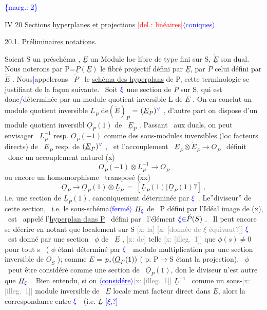 \documentclass[11pt]{article}
\newcommand{\scanpage}[1]{\par\bigskip\noindent{\small\sffamily[scan #1]}\par}
\newcommand{\hand}[1]{\textcolor{blue}{#1}}
\let\over\relax
\newcommand{\over}[2]{\textcolor{gray}{#1}\textcolor{blue}{\ensuremath{^{\!\nearrow}}#2}}
\newcommand{\inserted}[2][]{\textcolor{blue}{$\langle$#2$\rangle$}}
\newcommand{\margin}[1]{\textcolor{blue}{\{\textsf{marg.:} #1\}}}
\newcommand{\deleted}[1]{\textcolor{red}{[\textsf{del.:} #1]}}
\newcommand{\xout}[1]{\textcolor{gray}{[\textsf{x:} #1]}}
\newcommand{\uline}[1]{\underline{#1}}
\newcommand{\unsure}[1]{[#1?]}
\newcommand{\illegible}[1]{[\textsf{illeg.\ #1}]}
\begin{document}
\margin{2}

\clearpage
\scanpage{25/4}
IV 20 \quad \uline{Sections hyperplanes et projections \deleted{linéaires}\inserted{coniques}}.

20.1. \quad \uline{Préliminaires \over{de}{\unsure{et}} notations}.

Soient S un \quad préschéma , $\underline{E}$ un Module loc libre de type fini sur S,
$\check{\underline{E}}$ son dual. Nous noterons par P=$\underline{P}(\underline{E})$ le fibré projectif défini par $\underline{E}$,
par $\check{P}$ celui défini par $\check{\underline{E}}$ . Nous\hand{|}appelerons \ $\check{P}$ \ le \uline{schéma des hyperplans}
de P, cette terminologie se justifiant de la façon suivante. \ Soit
$\hand{\xi}$ une section de $\check{P}$ sur S, qui est donc\hand{/}déterminée par un module quotient
inversible L de $\check{\underline{E}}$ . On en conclut un module quotient inversible
$\underline{L}_P$ de$(\check{\underline{E}})_P$ = $(\underline{E}_P)^{\hand{\vee}}$ , d'autre part on dispose d'un module quotient inversibl
$\underline{O}_P(1)$ de \ $\underline{E}_P$ . Passant \ aux duals, on peut envisager \ $\underline{L}_P^{-1}$ resp. $\underline{O}_P(-1)$
comme des sous-modules inversibles (loc facteurs directs) de \ $\underline{E}_P$ resp.
de $(\underline{E}_P)^{\hand{\vee}}$ , \ et l'accouplement \ $\underline{E}_P \otimes \check{\underline{E}}_P \longrightarrow \underline{O}_P$ \ définit \ donc un
accouplement naturel
(x) \[ \underline{O}_P(-1)\otimes\underline{L}_P^{-1} \to \underline{O}_P \]
ou encore un homomorphisme \ transposé
(xx) \[ \underline{O}_P \longrightarrow \underline{O}_P(1)\otimes\underline{L}_P \ = \ \unsure{\underline{L}_P(1)|\underline{D}_P(1)} \ , \]
i.e. une section de $\underline{L}_P(1)$, canoniquement déterminée par $\hand{\xi}$ . Le''diviseur''
de cette section, \ i.e. le sous-schéma\inserted{fermé} $H_{\hand{\xi}}$ de \ P défini par l'Idéal
image de (x), \ est \ appelé l'\uline{hyperplan dans P} \ défini par \ l'élément
$\hand{\xi} \hand{\in} \check{P}(S)$ . \ Il peut encore se décrire en notant que localement sur S \xout{la}
\xout{\unsure{donnée de $\check{\xi}$ équivaut}} \quad $\hand{\xi}$ \ est donné par une section \ $\phi$ de \ $\underline{E}$ , \xout{de} telle
\xout{\illegible{1}} que $\phi(s) \neq 0$ pour tout s \ ( $\phi$ étant déterminé par $\hand{\xi}$ \ modulo
multiplication par une section inversible de $\underline{O}_S$ ); comme $\underline{E}$ = $p_{\hand{*}}(\underline{O}_P(1))$
( p: P$\to$S étant la projection), \ $\phi$ \ peut être considéré comme une section
de \ $\underline{O}_P(1)$, don\over{c}{t} le diviseur n'est autre que $H_{\hand{\xi}}$. \ Bien entendu, si on
\inserted[typed]{\uline{considére}}\xout{\illegible{1}} $\underline{L}^{-1}$ \ comme un sous-\xout{\illegible{1}} module inversible de \ $\underline{E}$ locale
ment facteur direct dans $\underline{E}$, alors la correspondance entre $\hand{\xi}$ \ (i.e. $\underline{L}$ \hand{\unsure{$\xi$,}}
\end{document}
